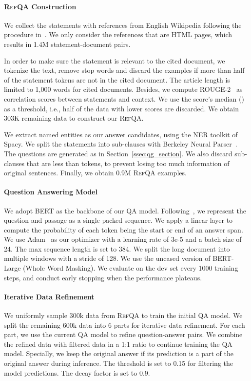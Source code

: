 \documentclass[11pt,a4paper]{article}
\newcommand\refqa{\textsc{RefQA}}
\begin{document}
\paragraph{\refqa{} Construction} 
We collect the statements with references from English Wikipedia following the procedure in~\cite{wikiref}.
We only consider the references that are HTML pages, which results in 1.4M statement-document pairs.


In order to make sure the statement is relevant to the cited document, we tokenize the text, remove stop words and discard the examples if more than half of the statement tokens are not in the cited document. 
The article length is limited to 1,000 words for cited documents.
Besides, we compute ROUGE-2~\citep{lin-2004-rouge} as correlation scores between statements and context.
We use the score's median () as a threshold, i.e., half of the data with lower scores are discarded.
We obtain 303K remaining data to construct our \refqa{}.

We extract named entities as our answer candidates, using the NER toolkit of Spacy. We split the statements into sub-clauses with Berkeley Neural Parser~\citep{Kitaev-2018-SelfAttentive}.
The questions are generated as in Section~\ref{ssec:qg_section}.
We also discard sub-clauses that are less than  tokens, to prevent losing too much information of original sentences.
Finally, we obtain 0.9M \refqa{} examples.



\paragraph{Question Answering Model}
We adopt BERT as the backbone of our QA model.
Following~\cite{BERT}, we represent the question and passage as a single packed sequence.
We apply a linear layer to compute the probability of each token being the start or end of an answer span.
We use Adam~\citep{adam} as our optimizer with a learning rate of 3e-5 and a batch size of 24.
The max sequence length is set to 384.
We split the long document into multiple windows with a stride of 128. 
We use the uncased version of BERT-Large (Whole Word Masking). 
We evaluate on the dev set every 1000 training steps, and conduct early stopping when the performance plateaus. 


\paragraph{Iterative Data Refinement}
We uniformly sample 300k data from \refqa{} to train the initial QA model.
We split the remaining 600k data into 6 parts for iterative data refinement.
For each part, we use the current QA model to refine question-answer pairs. We combine the refined data with filtered data in a 1:1 ratio to continue training the QA model.
Specially, we keep the original answer if its prediction is a part of the original answer during inference.
The threshold  is set to 0.15 for filtering the model predictions. The decay factor  is set to 0.9. 
\end{document}
